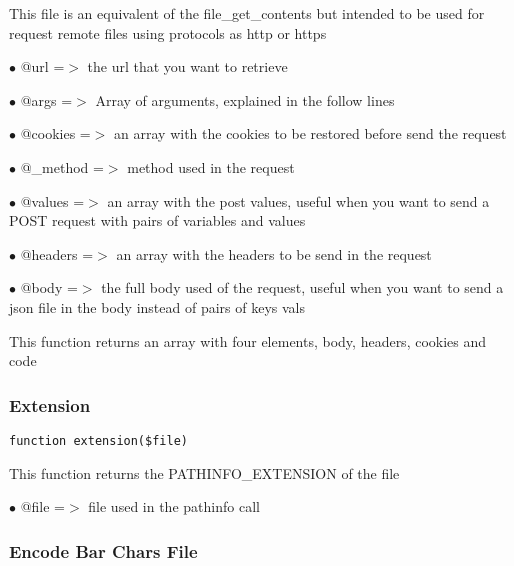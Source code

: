 \documentclass[a4paper]{article}
\begin{document}
This file is an equivalent of the file\_get\_contents but intended to be used
for request remote files using protocols as http or https

\begin{compactitem}
\item[\color{myblue}$\bullet$] @url     =$>$ the url that you want to retrieve
\item[\color{myblue}$\bullet$] @args    =$>$ Array of arguments, explained in the follow lines
\item[\color{myblue}$\bullet$] @cookies =$>$ an array with the cookies to be restored before send the request
\item[\color{myblue}$\bullet$] @\_method =$>$ method used in the request
\item[\color{myblue}$\bullet$] @values  =$>$ an array with the post values, useful when you want to send a POST
            request with pairs of variables and values
\item[\color{myblue}$\bullet$] @headers =$>$ an array with the headers to be send in the request
\item[\color{myblue}$\bullet$] @body    =$>$ the full body used of the request, useful when you want to send a
            json file in the body instead of pairs of keys vals
\end{compactitem}

This function returns an array with four elements, body, headers, cookies and code

\hypertarget{toc134}{}
\subsubsection{Extension}

\begin{lstlisting}
function extension($file)
\end{lstlisting}

This function returns the PATHINFO\_EXTENSION of the file

\begin{compactitem}
\item[\color{myblue}$\bullet$] @file =$>$ file used in the pathinfo call
\end{compactitem}

\hypertarget{toc135}{}
\subsubsection{Encode Bar Chars File}
\end{document}
